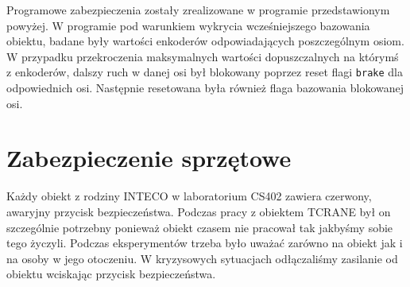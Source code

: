 Programowe zabezpieczenia zostały zrealizowane w programie przedstawionym powyżej. W programie pod warunkiem wykrycia wcześniejszego bazowania obiektu, badane były wartości enkoderów odpowiadających poszczególnym osiom. W przypadku przekroczenia maksymalnych wartości dopuszczalnych na którymś z enkoderów, dalszy ruch w danej osi był blokowany poprzez reset flagi \verb+brake+ dla odpowiednich osi. Następnie resetowana była również flaga bazowania blokowanej osi.


\section{Zabezpieczenie sprzętowe}
Każdy obiekt z rodziny INTECO w laboratorium CS402 zawiera czerwony, awaryjny przycisk bezpieczeństwa. Podczas pracy z obiektem TCRANE był on szczególnie potrzebny ponieważ obiekt czasem nie pracował tak jakbyśmy sobie tego życzyli. Podczas eksperymentów trzeba było uważać zarówno na obiekt jak i na osoby w jego otoczeniu. W kryzysowych sytuacjach odłączaliśmy zasilanie od obiektu wciskając przycisk bezpieczeństwa.
\label{czerwony_przycisk}
